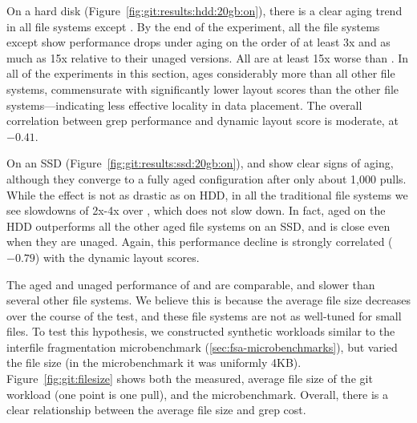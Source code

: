



On a hard disk (Figure~\ref{fig:git:results:hdd:20gb:on}), there is a clear
aging trend in all file systems except \betrfs.  By the end of the experiment,
all the file systems except \betrfs show performance drops under aging on the
order of at least 3x and as much as 15x relative to their unaged versions. All
are at least 15x worse than \betrfs. In all of the experiments in this section,
\ftwofs ages considerably more than all other file systems, commensurate with
significantly lower layout scores than the other file systems---indicating less
effective locality in data placement. The overall correlation between grep
performance and dynamic layout score is moderate, at $-0.41$. 

On an SSD (Figure~\ref{fig:git:results:ssd:20gb:on}), \btrfs and \xfs show
clear signs of aging, although they converge to a fully aged configuration
after only about 1,000 pulls. While the effect is not as drastic as on HDD, in
all the traditional file systems we see slowdowns of 2x-4x over \betrfs, which
does not slow down.  In fact, aged \betrfs on the HDD outperforms all the other
aged file systems on an SSD, and is close even when they are unaged. Again,
this performance decline is strongly correlated ($-0.79$) with the dynamic
layout scores.

The aged and unaged performance of \ext and \zfs are comparable, and slower
than several other file systems.  We believe this is because the average file
size decreases over the course of the test, and these file systems are not as
well-tuned for small files.  To test this hypothesis, we constructed
synthetic workloads similar to the interfile fragmentation microbenchmark
(\cref{sec:fsa-microbenchmarks}), but varied the file size (in the microbenchmark it
was uniformly 4KB). 
Figure~\ref{fig:git:filesize} shows both the measured, average file
size of the git workload (one point is one pull), and the microbenchmark.
Overall, there is a clear relationship between the average file size and grep
cost. 

